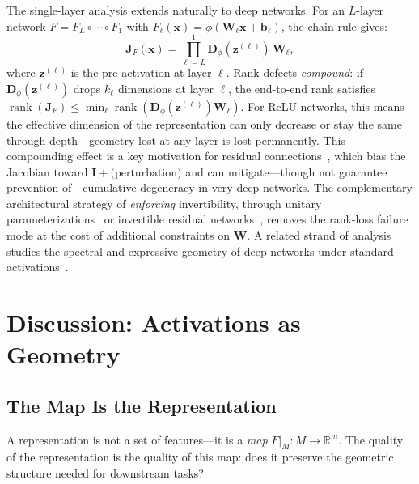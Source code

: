 \documentclass[11pt,a4paper]{article}
\theoremstyle{remark}
\begin{document}
The single-layer analysis extends naturally to deep networks.
For an $L$-layer network $F = F_L \circ \cdots \circ F_1$ with $F_\ell(\mathbf{x}) = \phi(\mathbf{W}_\ell \mathbf{x} + \mathbf{b}_\ell)$, the chain rule gives:
\begin{equation}
  \mathbf{J}_F(\mathbf{x}) = \prod_{\ell=L}^{1} \mathbf{D}_{\phi}(\mathbf{z}^{(\ell)}) \, \mathbf{W}_\ell,
  \label{eq:deep-jacobian}
\end{equation}
where $\mathbf{z}^{(\ell)}$ is the pre-activation at layer $\ell$.
Rank defects \emph{compound}: if $\mathbf{D}_{\phi}(\mathbf{z}^{(\ell)})$ drops $k_\ell$ dimensions at layer $\ell$, the end-to-end rank satisfies $\operatorname{rank}(\mathbf{J}_F) \leq \min_\ell \operatorname{rank}(\mathbf{D}_{\phi}(\mathbf{z}^{(\ell)}) \mathbf{W}_\ell)$.
For ReLU networks, this means the effective dimension of the representation can only decrease or stay the same through depth---geometry lost at any layer is lost permanently.
This compounding effect is a key motivation for residual connections~\cite{he2015resnet}, which bias the Jacobian toward $\mathbf{I} + \text{(perturbation)}$ and can mitigate---though not guarantee prevention of---cumulative degeneracy in very deep networks.
The complementary architectural strategy of \emph{enforcing} invertibility, through unitary parameterizations~\cite{arjovsky2016unitary} or invertible residual networks~\cite{behrmann2019invertible}, removes the rank-loss failure mode at the cost of additional constraints on $\mathbf{W}$.
A related strand of analysis studies the spectral and expressive geometry of deep networks under standard activations~\cite{montufar2014number,poole2016exponential,pennington2018emergence,raghu2017svcca}.

\section{Discussion: Activations as Geometry}
\label{sec:deeper}

\subsection{The Map Is the Representation}

A representation is not a set of features---it is a \emph{map} $F|_M: M \to \mathbb{R}^m$.
The quality of the representation is the quality of this map: does it preserve the geometric structure needed for downstream tasks?
\end{document}
